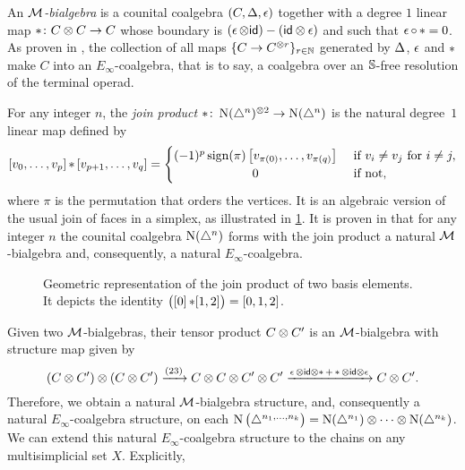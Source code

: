 An \textit{$\mathcal{M}$-bialgebra} is a counital coalgebra $(C, \operatorname{\Delta}, \operatorname{\epsilon})$ together with a degree $1$ linear map $\operatorname{\ast} \colon C \otimes C \to C$ whose boundary is $(\operatorname{\epsilon} \otimes \mathsf{id}) - (\mathsf{id} \otimes \operatorname{\epsilon})$ and such that $\operatorname{\epsilon} \circ \operatorname{\ast} = 0$.
As proven in \cite{medina2020prop1}, the collection of all maps $\{C \to C^{\otimes r}\}_{r \in \mathbb{N}}$ generated by $\operatorname{\Delta}$, $\operatorname{\epsilon}$ and $\operatorname{\ast}$ make $C$ into an $E_\infty$-coalgebra, that is to say, a coalgebra over an $\mathbb{S}$-free resolution of the terminal operad.

For any integer $n$, the \textit{join product} $\ast \colon \operatorname{N}(\triangle^n)^{\otimes 2} \to \operatorname{N}(\triangle^n)$ is the natural degree~$1$ linear map defined by
\begin{equation*}
	\left[v_0, \dots, v_p \right] \pr \left[v_{p+1}, \dots, v_q\right] =
	\begin{cases} (-1)^{p} \sign(\pi) \left[v_{\pi(0)}, \dots, v_{\pi(q)}\right] & \text{ if } v_i \neq v_j \text{ for } i \neq j, \\
		\hfil 0 & \text{ if not}, \end{cases}
\end{equation*}
where $\pi$ is the permutation that orders the vertices.
It is an algebraic version of the usual join of faces in a simplex, as illustrated in \cref{f:join of faces}.
It is proven in \cite{medina2020prop1} that for any integer $n$ the counital coalgebra $\operatorname{N}(\triangle^n)$ forms with the join product a natural $\mathcal{M}$-bialgebra and, consequently, a natural $E_\infty$-coalgebra.

\begin{figure}
	
	\caption{Geometric representation of the join product of two basis elements. It depicts the identity $\big([0] \operatorname{\ast} [1,2]\big) = [0,1,2]$.}
	\label{f:join of faces}
\end{figure}

Given two $\mathcal{M}$-bialgebras, their tensor product $C \otimes C^\prime$ is an $\mathcal{M}$-bialgebra with structure map given by
\[
(C \otimes C^\prime) \otimes (C \otimes C^\prime) \xrightarrow{(23)}
C \otimes C \otimes C^\prime \otimes C^\prime
\xrightarrow{\operatorname{\epsilon} \otimes \mathsf{id} \otimes \operatorname{\ast} + \operatorname{\ast} \otimes \mathsf{id} \otimes \operatorname{\epsilon}}
C \otimes C^\prime.
\]
Therefore, we obtain a natural $\mathcal{M}$-bialgebra structure, and, consequently a natural $E_\infty$-coalgebra structure, on each $\operatorname{N} \big( \triangle^{n_1, \dots, n_k} \big) = \operatorname{N}(\triangle^{n_1}) \otimes \dotsb \otimes \operatorname{N}(\triangle^{n_k})$.
We can extend this natural $E_\infty$-coalgebra structure to the chains on any multisimplicial set $X$.
Explicitly, 

